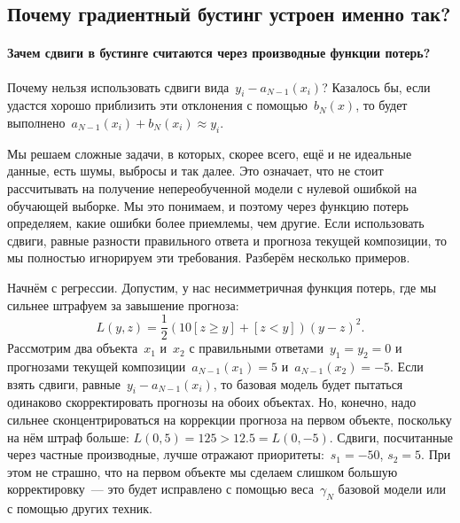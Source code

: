 \documentclass[12pt,fleqn]{article}
\begin{document}
\subsection{Почему градиентный бустинг устроен именно так?}

\paragraph{Зачем сдвиги в бустинге считаются через производные функции потерь?}
Почему нельзя использовать сдвиги вида~$y_i - a_{N - 1}(x_i)$?
Казалось бы, если удастся хорошо приблизить эти отклонения с помощью~$b_N(x)$,
то будет выполнено~$a_{N-1}(x_i) + b_N(x_i) \approx y_i$.

Мы решаем сложные задачи, в которых, скорее всего, ещё и не идеальные данные,
есть шумы, выбросы и так далее.
Это означает, что не стоит рассчитывать на получение непереобученной модели
с нулевой ошибкой на обучающей выборке.
Мы это понимаем, и поэтому через функцию потерь определяем,
какие ошибки более приемлемы, чем другие.
Если использовать сдвиги, равные разности правильного ответа и прогноза текущей композиции,
то мы полностью игнорируем эти требования.
Разберём несколько примеров.

Начнём с регрессии.
Допустим, у нас несимметричная функция потерь, где мы сильнее штрафуем за завышение прогноза:
\begin{equation}
\label{eq:asymmetricLoss}
    L(y, z)
    =
    \frac{1}{2}
    (10 [z \geq y] + [z < y])
    (y - z)^2.
\end{equation}
Рассмотрим два объекта~$x_1$ и~$x_2$ с правильными ответами~$y_1 = y_2 = 0$
и прогнозами текущей композиции~$a_{N - 1}(x_1) = 5$ и~$a_{N - 1}(x_2) = -5$.
Если взять сдвиги, равные~$y_i - a_{N - 1}(x_i)$,
то базовая модель будет пытаться одинаково скорректировать прогнозы на обоих объектах.
Но, конечно, надо сильнее сконцентрироваться на коррекции прогноза на первом объекте,
поскольку на нём штраф больше: $L(0, 5) = 125 > 12.5 = L(0, -5)$.
Сдвиги, посчитанные через частные производные, лучше отражают приоритеты:~$s_1 = -50$, $s_2 = 5$.
При этом не страшно, что на первом объекте мы сделаем слишком большую корректировку~---
это будет исправлено с помощью веса~$\gamma_N$ базовой модели или с помощью других техник.
\end{document}
